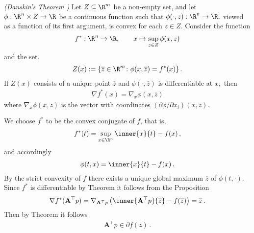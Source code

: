 \begin{proposition*}
  \emph{(Danskin's Theorem \cite[page 649]{Bertsekas2003})}
  Let 
  $
    Z \subseteq \R^m
  $
  be a non-empty set, 
  and let 
  $
    \phi :
    \R^n \times Z \to \R
  $
  be a continuous function such that
  $
    \phi(\cdot,z)
    :
    \R^n \to \R,
  $
  viewed as a function of its first argument, 
  is convex for each 
  $
    z \in Z.
  $
  Consider the function
  \begin{gather}
    f^*:\R^n \to \R
    ,
    \qquad
    x\mapsto
    \sup_{z\in Z}
    \phi(x,z)
  \end{gather}
  and
  the set.
  \begin{gather}
    Z(x)
    :=
    \left\{ 
      \overline{z} \in \R^m
      \colon
      \phi(x, \overline{z})
      =
      f^*(x)
  \right\}
  .
  \end{gather}
  If $Z(x)$ consists of a unique point 
  $\overline{z}$
  and
  $
    \phi(\cdot, \overline{z})
  $
  is differentiable at $x,$
  then
  \begin{gather}
    \nabla f^*(x)
    =
    \nabla_x
    \phi(x,\overline{z})
  \end{gather}
  where 
  $
    \nabla_x
    \phi(x,\overline{z})
  $
  is the vector with coordinates
  $
    (\partial \phi / \partial x_i)
    (x,\overline{z})
  $.
\end{proposition*}
\begin{example*}
  We choose $f^*$ to be the convex conjugate of $f$, that is,
  \begin{gather}
    f^*(t)
    =
    \sup_{x\in\R^n}
    \inner{x}{t}-f(x)
    \,,
  \end{gather}
  and accordingly
  \begin{gather}
    \phi
    (t,x)
    =
    \inner{x}{t}-f(x)
    \,.
  \end{gather}
  By the strict convexity of $f$ there exists a unique
  global maximum $\overline{z}$ of $\phi(t,\cdot)$. 
  Since $f^*$ is differentiable by Theorem
  it follows from the Proposition
  \begin{gather}
    \nabla f^*(\mathbf{A}^\top p)
    =
    \nabla_{\mathbf{A}^\top p}
\left( 
    \inner
    {
      \mathbf{A}^\top p
    }
    {
      \overline{z}
    }
    -
    f
    (
      \overline{z}
    )
\right)
=
      \overline{z}
      \,.
  \end{gather}
  Then by Theorem it follows
\begin{gather}
  \mathbf{A}^\top p
  \in 
  \partial
    f
    (
      \overline{z}
    )
  \,.
\end{gather}
\end{example*}

